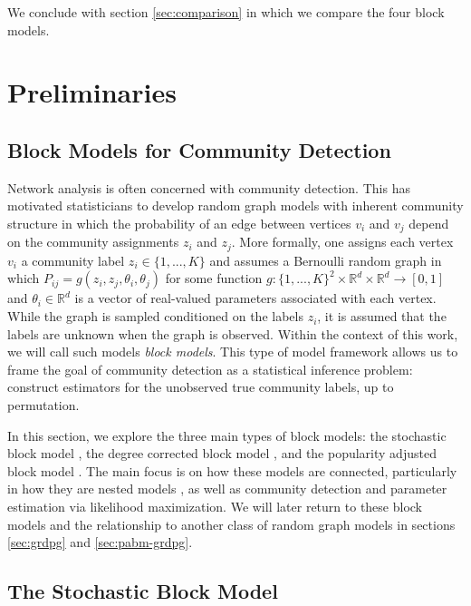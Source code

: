 \documentclass[
  12pt,
]{article}
\theoremstyle{definition}
\theoremstyle{definition}
\theoremstyle{definition}
\theoremstyle{definition}
\theoremstyle{remark}
\begin{document}
We conclude with section \ref{sec:comparison} in which we compare the four block models.

\newpage

\hypertarget{preliminaries}{%
\section{Preliminaries}\label{preliminaries}}

\hypertarget{sec:blockmodel}{%
\subsection{Block Models for Community Detection}\label{sec:blockmodel}}

Network analysis is often concerned with community detection.
This has motivated statisticians to develop random graph models with inherent community structure in which the probability of an edge between vertices \(v_i\) and \(v_j\) depend on the community assignments \(z_i\) and \(z_j\).
More formally, one assigns each vertex \(v_i\) a community label \(z_i \in \{1, ..., K\}\) and assumes a Bernoulli random graph in which \(P_{ij} = g(z_i, z_j, \theta_i, \theta_j)\) for some function \(g: \{1, ..., K\}^2 \times \mathbb{R}^d \times \mathbb{R}^d \to [0, 1]\) and \(\theta_i \in \mathbb{R}^d\) is a vector of real-valued parameters associated with each vertex.
While the graph is sampled conditioned on the labels \(z_i\), it is assumed that the labels are unknown when the graph is observed.
Within the context of this work, we will call such models \emph{block models}.
This type of model framework allows us to frame the goal of community detection as a statistical inference problem:
construct estimators for the unobserved true community labels, up to permutation.

In this section, we explore the three main types of block models:
the stochastic block model \citep{doi:10.1080/0022250X.1971.9989788}, the degree corrected block model \citep{Karrer_2011}, and the popularity adjusted block model \citep{307cbeb9b1be48299388437423d94bf1}.
The main focus is on how these models are connected, particularly in how they are nested models \citep{Noroozi2022}, as well as community detection and parameter estimation via likelihood maximization.
We will later return to these block models and the relationship to another class of random graph models in sections \ref{sec:grdpg} and \ref{sec:pabm-grdpg}.

\hypertarget{sec:sbm}{%
\subsection{The Stochastic Block Model}\label{sec:sbm}}
\end{document}
